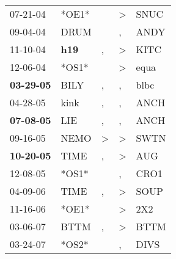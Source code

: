 \begin{supertabular}{p{0.07\textwidth}p{0.06\textwidth}p{0.02\textwidth}p{0.02\textwidth}p{0.06\textwidth}}
          07-21-04\textsuperscript{} &                            *OE1* &                  &     \textgreater &           SNUC\textsuperscript{} \\
          09-04-04\textsuperscript{} &           DRUM\textsuperscript{} &                  &                , &           ANDY\textsuperscript{} \\
          11-10-04\textsuperscript{} &   \textbf{h19\textsuperscript{}} &                , &     \textgreater &           KITC\textsuperscript{} \\
          12-06-04\textsuperscript{} &                            *OS1* &                  &     \textgreater &           equa\textsuperscript{} \\
 \textbf{03-29-05\textsuperscript{}} &           BILY\textsuperscript{} &                , &                , &           blbc\textsuperscript{} \\
          04-28-05\textsuperscript{} &           kink\textsuperscript{} &                , &                , &           ANCH\textsuperscript{} \\
 \textbf{07-08-05\textsuperscript{}} &            LIE\textsuperscript{} &                , &                , &           ANCH\textsuperscript{} \\
          09-16-05\textsuperscript{} &           NEMO\textsuperscript{} &     \textgreater &     \textgreater &           SWTN\textsuperscript{} \\
 \textbf{10-20-05\textsuperscript{}} &           TIME\textsuperscript{} &                , &     \textgreater &            AUG\textsuperscript{} \\
          12-08-05\textsuperscript{} &                            *OS1* &                  &                , &           CRO1\textsuperscript{} \\
          04-09-06\textsuperscript{} &           TIME\textsuperscript{} &                , &     \textgreater &           SOUP\textsuperscript{} \\
          11-16-06\textsuperscript{} &                            *OE1* &                  &     \textgreater &            2X2\textsuperscript{} \\
          03-06-07\textsuperscript{} &           BTTM\textsuperscript{} &                , &     \textgreater &           BTTM\textsuperscript{} \\
          03-24-07\textsuperscript{} &                            *OS2* &                  &                , &           DIVS\textsuperscript{} \\

\end{supertabular}
